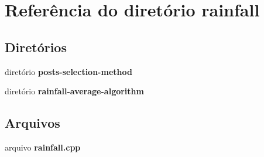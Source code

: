 \section{Referência do diretório rainfall}
\label{dir_867f58c120dc0af948f734ff50195875}
\subsection*{Diretórios}
\begin{DoxyCompactItemize}
\item 
diretório {\bf posts-\/selection-\/method}
\item 
diretório {\bf rainfall-\/average-\/algorithm}
\end{DoxyCompactItemize}
\subsection*{Arquivos}
\begin{DoxyCompactItemize}
\item 
arquivo {\bf rainfall.\+cpp}
\end{DoxyCompactItemize}
